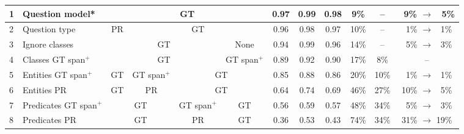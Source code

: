 \begin{table}[!t]
\begin{tabular}{ll|cccc|ccc|c|cc}
\hline
1   & Question model*     & \multicolumn{4}{c|}{\cellcolor{lightgray}GT}            & 0.97 & 0.99 & 0.98 & \phantom{0}9\%             & --        & ~9\%   $\rightarrow$ ~5\%     \\
\hline
2   & Question type  & PR & \multicolumn{3}{c|}{\cellcolor{lightgray} GT}    & 0.96 & 0.98 & 0.97 & 10\%             & --        & ~1\%   $\rightarrow$ ~1\%     \\
\hline
3   & Ignore classes  & \multicolumn{3}{c|}{\cellcolor{lightgray}GT}&    None      & 0.94 & 0.99 & 0.96 & 14\%             & --        & ~5\%   $\rightarrow$ ~3\%     \\
4   & Classes GT span$^+$  & \multicolumn{3}{c|}{\cellcolor{lightgray}GT}&    GT span$^+$     & 0.89 & 0.92 & 0.90 & 17\%             & \phantom{0}8\%      &  --    \\
\hline
5   & Entities GT span$^+$  & {\cellcolor{lightgray}GT}  &  GT span$^+$ & \multicolumn{2}{c|}{\cellcolor{lightgray} GT} & 0.85 & 0.88 & 0.86 & 20\%            & 10\%     & ~1\%   $\rightarrow$ ~1\%     \\
6   & Entities PR & {\cellcolor{lightgray}GT}& PR& \multicolumn{2}{c|}{\cellcolor{lightgray} GT} &  0.64 & 0.74 & 0.69 & 46\%            & 27\%     & 10\%  $\rightarrow$ ~5\%     \\
\hline
7   & Predicates GT span$^+$  & \multicolumn{2}{c}{\cellcolor{lightgray} GT} & GT span$^+$ & {\cellcolor{lightgray}GT}& 0.56 & 0.59 & 0.57 & 48\%            & 34\%     & ~5\%   $\rightarrow$ ~3\%     \\
8   & Predicates PR    & \multicolumn{2}{c}{\cellcolor{lightgray} GT} & PR & {\cellcolor{lightgray}GT} & 0.36 & 0.53 & 0.43 & 74\%            & 34\%     & 31\%  $\rightarrow$ 19\%    \\
\hline
\end{tabular}
\end{table}

